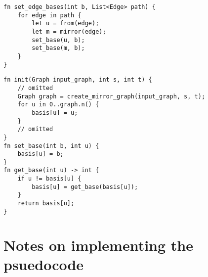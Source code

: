 \begin{lstlisting}[caption={Set edge bases},label=Listing,mathescape=true]
fn set_edge_bases(int b, List<Edge> path) {
    for edge in path {
        let u = from(edge);
        let m = mirror(edge);
        set_base(u, b);
        set_base(m, b);
    }
}
\end{lstlisting}


\begin{lstlisting}[caption={Basis},label=Listing,mathescape=true]
fn init(Graph input_graph, int s, int t) {
    // omitted
    Graph graph = create_mirror_graph(input_graph, s, t);
    for u in 0..graph.n() {
        basis[u] = u;
    }
    // omitted
}
fn set_base(int b, int u) {
    basis[u] = b;
}
fn get_base(int u) -> int {
    if u != basis[u] {
        basis[u] = get_base(basis[u]);
    }
    return basis[u];
}

\end{lstlisting}

\section{Notes on implementing the psuedocode}